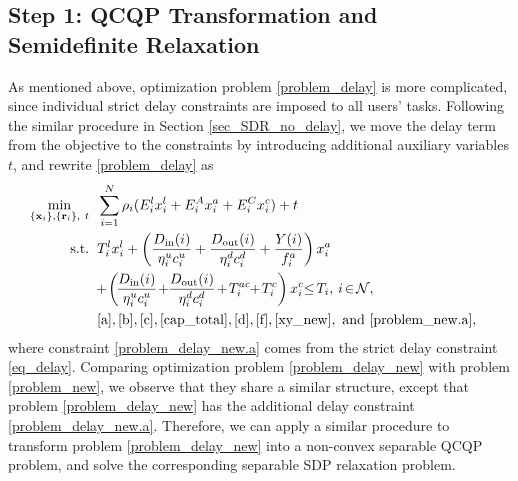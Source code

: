 \documentclass[10pt,journal,compsoc]{IEEEtran}
\begin{document}
{\subsection{Step 1: QCQP Transformation and Semidefinite Relaxation}
As mentioned above, optimization problem \eqref{problem_delay} is
more complicated, since individual strict delay constraints are
imposed to all users' tasks. Following the similar procedure in
Section \ref{sec_SDR_no_delay}, we move the delay term from the
objective to the constraints by introducing additional auxiliary
variables $t$, and rewrite \eqref{problem_delay} as
\begin{align}\hspace*{-0.3cm}
\min\limits_{\{ \mathbf{x}_i \}, \{ \mathbf{r}_i \},\ t}
&\quad \hspace*{-0.15cm}\sum_{i=1}^N\rho_i(E^l_{i}x^l_{i}+E^A_ix^a_{i}+E^C_ix^c_{i})+t\label{problem_delay_new}\allowdisplaybreaks\\
\text{s.t.}
&\quad \hspace*{-0.15cm}T^l_{i}x^l_{i}+\left(\frac{D_{{\textrm{in}}}(i)}{\eta^u_ic^u_{i}}+\frac{D_{{\textrm{out}}}(i)}{\eta^d_ic^d_{i}}+\frac{Y(i)}{f^a_i}\right)x^a_{i}\nonumber\allowdisplaybreaks\\
&\quad \hspace*{-0.25cm}+\hspace*{-0.05cm}\left(\hspace*{-0.05cm}\frac{D_{{\textrm{in}}}(i)}{\eta^u_ic^u_{i}}\hspace*{-0.05cm}+\hspace*{-0.1cm}\frac{D_{{\textrm{out}}}(i)}{\eta^d_ic^d_{i}}\hspace*{-0.05cm}+\hspace*{-0.05cm}T^{ac}_i\hspace*{-0.1cm}+\hspace*{-0.05cm}T^{c}_i\right)x^c_{i}\hspace*{-0.1cm}\leq \hspace*{-0.05cm}T_i,\  \hspace*{-0.05cm}i\hspace*{-0.05cm}\in\hspace*{-0.05cm}\mathcal{N},\hspace*{-0.05cm}\label{problem_delay_new.a}\allowdisplaybreaks\\
&\quad
\hspace*{-0.15cm}\eqref{a},\eqref{b},\eqref{c},\eqref{cap_total},\eqref{d},\eqref{f},\eqref{xy_new},\
\mathrm{and}\ \eqref{problem_new.a},\nonumber
\end{align}
where constraint \eqref{problem_delay_new.a} comes from the strict
delay constraint \eqref{eq_delay}. Comparing optimization problem
\eqref{problem_delay_new} with problem \eqref{problem_new}, we
observe that they share a similar structure, except that problem
\eqref{problem_delay_new} has the additional delay constraint
\eqref{problem_delay_new.a}. Therefore, we can apply a similar
procedure to transform problem \eqref{problem_delay_new} into a
non-convex separable QCQP problem, and solve the corresponding
separable SDP relaxation problem.

}
\end{document}
